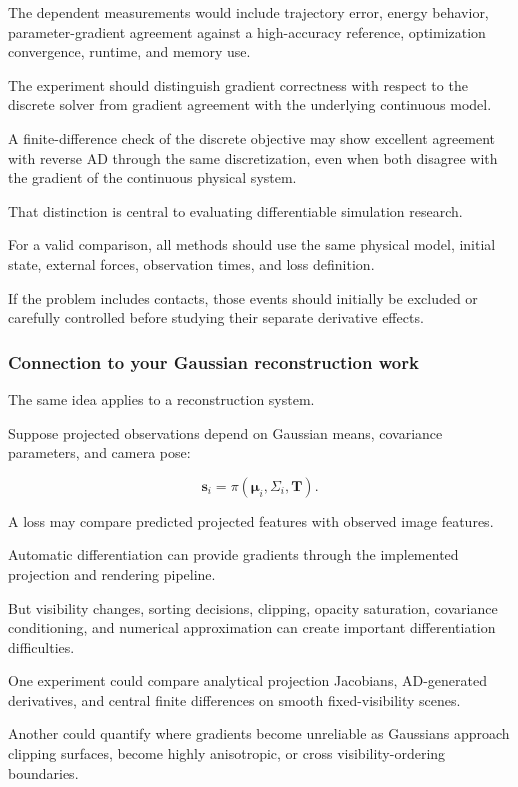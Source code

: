 The dependent measurements would include trajectory error, energy behavior, parameter-gradient agreement against a high-accuracy reference, optimization convergence, runtime, and memory use.

The experiment should distinguish gradient correctness with respect to the discrete solver from gradient agreement with the underlying continuous model.

A finite-difference check of the discrete objective may show excellent agreement with reverse AD through the same discretization, even when both disagree with the gradient of the continuous physical system.

That distinction is central to evaluating differentiable simulation research.

For a valid comparison, all methods should use the same physical model, initial state, external forces, observation times, and loss definition.

If the problem includes contacts, those events should initially be excluded or carefully controlled before studying their separate derivative effects.

\subsubsection{Connection to your Gaussian reconstruction work}\label{02-foundations-ii-ch022-connection-to-your-gaussian-reconstruction-work}

The same idea applies to a reconstruction system.

Suppose projected observations depend on Gaussian means, covariance parameters, and camera pose:

\[
\mathbf s_i= \pi(\boldsymbol\mu_i,\Sigma_i,\mathbf T).
\]

A loss may compare predicted projected features with observed image features.

Automatic differentiation can provide gradients through the implemented projection and rendering pipeline.

But visibility changes, sorting decisions, clipping, opacity saturation, covariance conditioning, and numerical approximation can create important differentiation difficulties.

One experiment could compare analytical projection Jacobians, AD-generated derivatives, and central finite differences on smooth fixed-visibility scenes.

Another could quantify where gradients become unreliable as Gaussians approach clipping surfaces, become highly anisotropic, or cross visibility-ordering boundaries.


